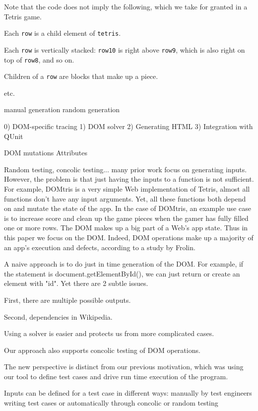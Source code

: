 
Note that the code does not imply the following, which we take for granted in a Tetris game.
\begin {compactitem}
\item Each {\tt row} is a child element of {\tt tetris}.
\item Each {\tt row} is vertically stacked: {\tt row10} is right above {\tt row9}, which is also right on top of {\tt row8}, and so on.
\item Children of a {\tt row} are blocks that make up a piece.  
\item etc.
\end {compactitem}

manual generation
random generation



0) DOM-specific tracing
1) DOM solver
2) Generating HTML
3) Integration with QUnit



DOM mutations
Attributes


Random testing, concolic testing... many prior work focus on generating inputs. 
However, the problem is that just having the inputs to a function is not sufficient.  
For example, DOMtris is a very simple Web implementation of Tetris, almost all functions don't have any input arguments.  
Yet, all these functions both depend on and mutate the state of the app.  
In the case of DOMtris, an example use case is to increase score and clean up the game pieces when the gamer has fully filled one or more rows.  
The DOM makes up a big part of a Web's app state.  
Thus in this paper we focus on the DOM.  
Indeed, DOM operations make up a majority of an app's execution and defects, according to a study by Frolin.  

A naive approach is to do just in time generation of the DOM.  
For example, if the statement is document.getElementById(), we can just return or create an element with "id".  
Yet there are 2 subtle issues.

First, there are multiple possible outputs.  

Second, dependencies in Wikipedia.  

Using a solver is easier and protects us from more complicated cases.

Our approach also supports concolic testing of DOM operations.



The new perspective is distinct from our previous motivation, which was using our tool to define test cases and drive run time execution of the program.  

Inputs can be defined for a test case in different ways: manually by test engineers writing test cases or automatically through concolic or random testing


